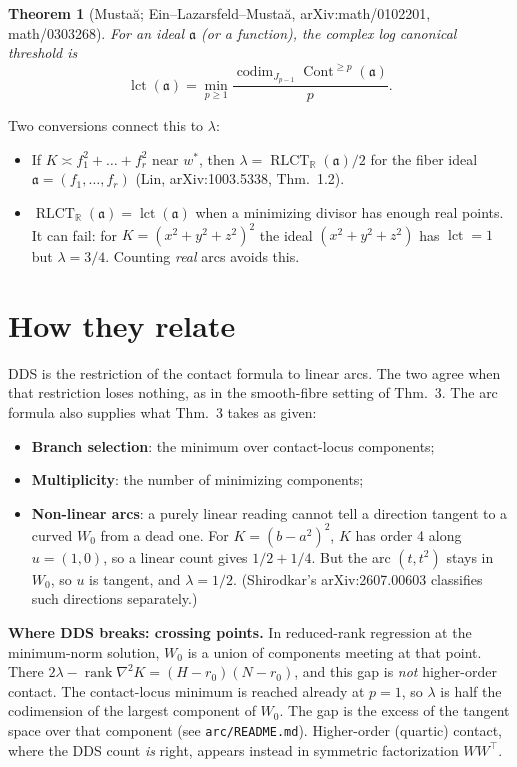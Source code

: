 \documentclass[11pt]{article}
\newtheorem{thm}{Theorem}
\newcommand{\Mus}{Musta\textcommabelow{t}\u{a}}
\newcommand{\Cont}{\operatorname{Cont}}
\begin{document}
\begin{thm}[\Mus; Ein--Lazarsfeld--\Mus, arXiv:math/0102201, math/0303268]
For an ideal $\mathfrak a$ (or a function), the complex log canonical threshold is
\[
\operatorname{lct}(\mathfrak a) = \min_{p \geq 1}
\frac{\operatorname{codim}_{J_{p-1}} \Cont^{\geq p}(\mathfrak a)}{p}.
\]
\end{thm}

Two conversions connect this to $\lambda$:
\begin{itemize}
\item If $K \asymp f_1^2 + \dots + f_r^2$ near $w^*$, then $\lambda = \operatorname{RLCT}_{\mathbb R}(\mathfrak a)/2$
  for the fiber ideal $\mathfrak a = (f_1,\dots,f_r)$ (Lin, arXiv:1003.5338, Thm.~1.2).
\item $\operatorname{RLCT}_{\mathbb R}(\mathfrak a) = \operatorname{lct}(\mathfrak a)$ when a
  minimizing divisor has enough real points. It can fail: for
  $K = (x^2+y^2+z^2)^2$ the ideal $(x^2+y^2+z^2)$ has $\operatorname{lct} = 1$ but
  $\lambda = 3/4$. Counting \emph{real} arcs avoids this.
\end{itemize}

\section*{How they relate}

DDS is the restriction of the contact formula to linear arcs. The two agree when that
restriction loses nothing, as in the smooth-fibre setting of Thm.~3. The arc formula
also supplies what Thm.~3 takes as given:
\begin{itemize}
\item \textbf{Branch selection}: the minimum over contact-locus components;
\item \textbf{Multiplicity}: the number of minimizing components;
\item \textbf{Non-linear arcs}: a purely linear reading cannot tell a direction tangent
  to a curved $W_0$ from a dead one. For $K = (b - a^2)^2$, $K$ has order 4 along
  $u = (1,0)$, so a linear count gives $1/2 + 1/4$. But the arc $(t, t^2)$ stays in $W_0$,
  so $u$ is tangent, and $\lambda = 1/2$. (Shirodkar's arXiv:2607.00603 classifies such
  directions separately.)
\end{itemize}

\textbf{Where DDS breaks: crossing points.} In reduced-rank regression at the minimum-norm
solution, $W_0$ is a union of components meeting at that point. There
$2\lambda - \operatorname{rank} \nabla^2 K = (H - r_0)(N - r_0)$, and this gap is
\emph{not} higher-order contact. The contact-locus minimum is reached already at $p = 1$,
so $\lambda$ is half the codimension of the largest component of $W_0$. The gap is the
excess of the tangent space over that component (see \texttt{arc/README.md}).
Higher-order (quartic) contact, where the DDS count \emph{is} right, appears instead in
symmetric factorization $WW^\top$.
\end{document}
